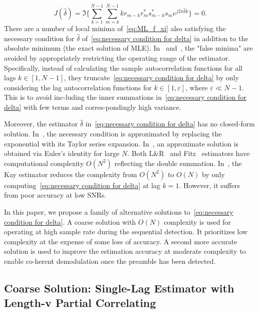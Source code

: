 \begin{equation}
    \label{eq:necessary condition for delta}
    J(\hat{\delta}) = \Im\bigg\{\sum_{k=1}^{N-1}{\sum_{m=k}^{N-1}{kr_{m-k}r_m^{*}s_{m-k}^{*}s_m}e^{j2\pi\hat{\delta}k}}\bigg\}=0.
    \end{equation}
There are a number of local minima of~\eqref{eq:ML_f_xi} also satisfying
the necessary condition for $\hat{\delta}$ of~\eqref{eq:necessary condition for delta} in addition to the absolute minimum
(the exact solution of MLE). In~\cite{Luise_Reggiannini_95} and~\cite{Fitz_94}, the "false minima" are avoided
by appropriately restricting the operating range of the estimator. Specifically,
instead of calculating the sample autocorrelation functions for all lags $k\in[1,N-1]$, 
they truncate~\eqref{eq:necessary condition for delta} by only considering the lag autocorrelation functions for $k{\in}[1,\varepsilon]$,
where $\varepsilon {\ll} N{-}1$. This is to avoid 
inc-luding the inner summations in~\eqref{eq:necessary condition for delta} with few
terms and corres-pondingly high variance.

Moreover, the estimator $\hat{\delta}$ in~\eqref{eq:necessary condition for delta} has no closed-form solution.
In~\cite{Luise_Reggiannini_95}, the necessary condition is approximated by replacing the exponential with its Taylor series expansion.
In~\cite{Fitz_94}, an approximate solution is obtained via Euler's identity for large $N$.
Both L\&R~\cite{Luise_Reggiannini_95} and Fitz~\cite{Fitz_94} estimators have computational complexity $O(N^2)$ 
reflecting the double summation. In~\cite{kay_89}, the Kay estimator reduces the complexity from $O(N^2)$ to $O(N)$ by only computing~\eqref{eq:necessary condition for delta} at lag $k=1$.
However, it suffers from poor accuracy at low SNRs.

In this paper, we propose a family of alternative solutions to~\eqref{eq:necessary condition for delta}.
A coarse solution with $O(N)$ complexity is used for operating at high sample rate during the sequential detection.
It prioritizes low complexity at the expense of some loss of accuracy. A second more accurate solution is used to improve
the estimation accuracy at moderate complexity to enable co-herent demodulation once the preamble has been detected. 

\subsection{Coarse Solution: Single-Lag Estimator with Length-v Partial Correlating}

